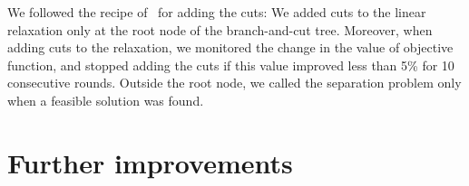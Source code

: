 \documentclass[]{article}
\begin{document}
We followed the recipe of~\citet{CarvajalCGVW13} for adding the cuts: We added cuts to the
linear relaxation only at the root node of the branch-and-cut tree.
Moreover, when adding cuts to the relaxation, we monitored the change in
the value of objective function, and stopped adding the cuts if this
value improved less than 5\% for 10 consecutive rounds. Outside the root
node, we called the separation problem only when a feasible solution was
found.

\section{Further improvements}\label{sec:improvement}



\end{document}
